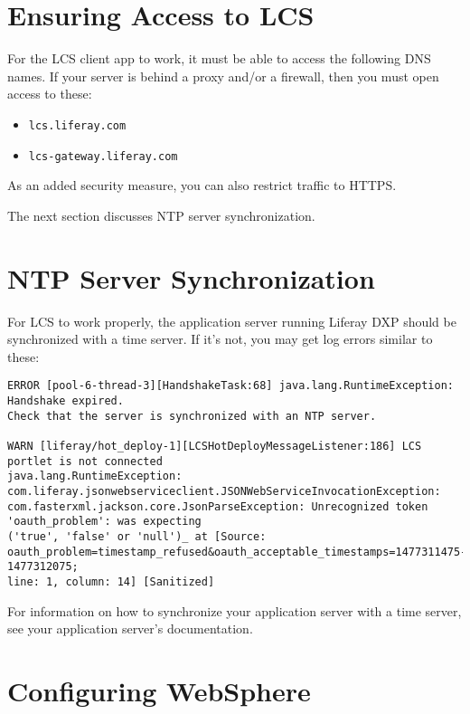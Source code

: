 \section{Ensuring Access to LCS}\label{ensuring-access-to-lcs}

For the LCS client app to work, it must be able to access the following
DNS names. If your server is behind a proxy and/or a firewall, then you
must open access to these:

\begin{itemize}
\tightlist
\item
  \texttt{lcs.liferay.com}
\item
  \texttt{lcs-gateway.liferay.com}
\end{itemize}

As an added security measure, you can also restrict traffic to HTTPS.

The next section discusses NTP server synchronization.

\section{NTP Server Synchronization}\label{ntp-server-synchronization}

For LCS to work properly, the application server running Liferay DXP
should be synchronized with a time server. If it's not, you may get log
errors similar to these:

\begin{verbatim}
ERROR [pool-6-thread-3][HandshakeTask:68] java.lang.RuntimeException: Handshake expired. 
Check that the server is synchronized with an NTP server. 

WARN [liferay/hot_deploy-1][LCSHotDeployMessageListener:186] LCS portlet is not connected 
java.lang.RuntimeException: com.liferay.jsonwebserviceclient.JSONWebServiceInvocationException: 
com.fasterxml.jackson.core.JsonParseException: Unrecognized token 'oauth_problem': was expecting 
('true', 'false' or 'null')_ at [Source: oauth_problem=timestamp_refused&oauth_acceptable_timestamps=1477311475-1477312075; 
line: 1, column: 14] [Sanitized]
\end{verbatim}

For information on how to synchronize your application server with a
time server, see your application server's documentation.

\section{Configuring WebSphere}\label{configuring-websphere}

